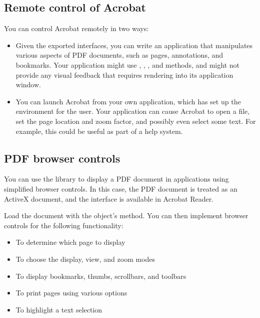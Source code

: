 \documentclass[letterpaper,12pt,english,openany,oneside]{sphinxmanual}
\begin{document}
\subsection{Remote control of Acrobat}
\label{\detokenize{IAC_DevApp_OLE_Support:remote-control-of-acrobat}}
You can control Acrobat remotely in two ways:
\begin{itemize}
\item {} 
Given the exported interfaces, you can write an application that manipulates various aspects of PDF documents, such as pages, annotations, and bookmarks. Your application might use , , , and  methods, and might not provide any visual feedback that requires rendering into its application window.

\item {} 
You can launch Acrobat from your own application, which has set up the environment for the user. Your application can cause Acrobat to open a file, set the page location and zoom factor, and possibly even select some text. For example, this could be useful as part of a help system.

\end{itemize}


\subsection{PDF browser controls}
\label{\detokenize{IAC_DevApp_OLE_Support:pdf-browser-controls}}
You can use the  library to display a PDF document in applications using simplified browser controls. In this case, the PDF document is treated as an ActiveX document, and the interface is available in Acrobat Reader.

Load the document with the  object’s  method. You can then implement browser controls for the following functionality:
\begin{itemize}
\item {} 
To determine which page to display

\item {} 
To choose the display, view, and zoom modes

\item {} 
To display bookmarks, thumbs, scrollbars, and toolbars

\item {} 
To print pages using various options

\item {} 
To highlight a text selection

\end{itemize}
\end{document}
